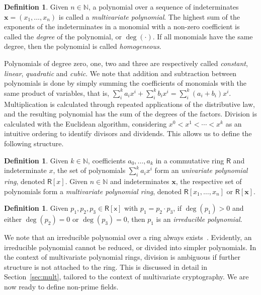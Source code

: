 \documentclass[draft, 12pt, a4paper, oneside]{memoir}
\theoremstyle{definition}
\newtheorem{definition}[theorem]{Definition}
\begin{document}
\begin{definition}
  Given $n \in \mathbb{N}$, a polynomial over a sequence of indeterminates $\mathbf{x} = (x_{1}, \dots, x_{n})$ is called a \emph{multivariate polynomial}. The highest sum of the exponents of the indeterminates in a monomial with a non-zero coefficient is called the \emph{degree} of the polynomial, or $\deg(\cdot)$. If all monomials have the same degree, then the polynomial is called \emph{homogeneous}.
\end{definition}

Polynomials of degree zero, one, two and three are respectively called \emph{constant}, \emph{linear}, \emph{quadratic} and \emph{cubic}. We note that addition and subtraction between polynomials is done by simply summing the coefficients of monomials with the same product of variables, that is, $\sum_{i}^{k} a_{i} x^{i} + \sum_{i}^{k} b_{i} x^{i} = \sum_{i}^{k} (a_{i} + b_{i}) x^{i}$. Multiplication is calculated through repeated applications of the distributive law, and the resulting polynomial has the sum of the degrees of the factors. Division is calculated with the Euclidean algorithm, considering $x^{0} < x^{1} < \cdots < x^{k}$ as an intuitive ordering to identify divisors and dividends. This allows us to define the following structure.

\begin{definition}
  Given $k \in \mathbb{N}$, coefficients $a_{0}, \dots, a_{k}$ in a commutative ring $\mathsf{R}$ and indeterminate $x$, the set of polynomials $\sum_{i}^{k} a_{i} x^{i}$ form an \emph{univariate polynomial ring}, denoted $\mathsf{R}[x]$. Given $n \in \mathbb{N}$ and indeterminates $\mathbf{x}$, the respective set of polynomials form a \emph{multivariate polynomial ring}, denoted $\mathsf{R}[x_{1}, \dots, x_{n}]$ or $\mathsf{R}[\mathbf{x}]$.
\end{definition}

\begin{definition}
  Given $p_{1}, p_{2}, p_{3} \in \mathsf{R}[\mathsf{x}]$ with $p_{1} = p_{2} \cdot p_{3}$, if $\deg(p_{1}) > 0$ and either $\deg(p_{2}) = 0$ or $\deg(p_{3}) = 0$, then $p_{1}$ is an \emph{irreducible polynomial}.
\end{definition}

We note that an irreducible polynomial over a ring always exists~\cite[Remark 2.1.25]{Mullen:2013}. Evidently, an irreducible polynomial cannot be reduced, or divided into simpler polynomials. In the context of multivariate polynomial rings, division is ambiguous if further structure is not attached to the ring. This is discussed in detail in Section~\ref{sec:mult}, tailored to the context of multivariate cryptography. We are now ready to define non-prime fields.
\end{document}
